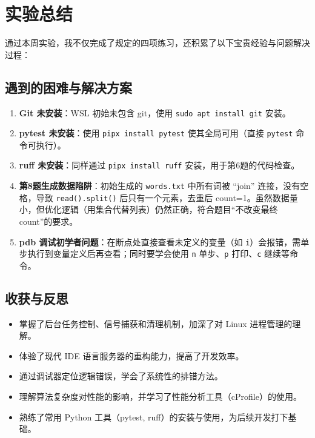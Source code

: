 \documentclass[12pt,a4paper]{ctexart}
\begin{document}
\newpage

\section*{实验总结}

通过本周实验，我不仅完成了规定的四项练习，还积累了以下宝贵经验与问题解决过程：

\subsection*{遇到的困难与解决方案}
\begin{enumerate}
    \item \textbf{Git 未安装}：WSL 初始未包含 git，使用 \texttt{sudo apt install git} 安装。
    \item \textbf{pytest 未安装}：使用 \texttt{pipx install pytest} 使其全局可用（直接 \texttt{pytest} 命令可执行）。
    \item \textbf{ruff 未安装}：同样通过 \texttt{pipx install ruff} 安装，用于第6题的代码检查。
    \item \textbf{第8题生成数据陷阱}：初始生成的 \texttt{words.txt} 中所有词被 ``join'' 连接，没有空格，导致 \texttt{read().split()} 后只有一个元素，去重后 count=1。虽然数据量小，但优化逻辑（用集合代替列表）仍然正确，符合题目“不改变最终 count”的要求。
    \item \textbf{pdb 调试初学者问题}：在断点处直接查看未定义的变量（如 \texttt{i}）会报错，需单步执行到变量定义后再查看；同时要学会使用 \texttt{n} 单步、\texttt{p} 打印、\texttt{c} 继续等命令。
\end{enumerate}

\subsection*{收获与反思}
\begin{itemize}
    \item 掌握了后台任务控制、信号捕获和清理机制，加深了对 Linux 进程管理的理解。
    \item 体验了现代 IDE 语言服务器的重构能力，提高了开发效率。
    \item 通过调试器定位逻辑错误，学会了系统性的排错方法。
    \item 理解算法复杂度对性能的影响，并学习了性能分析工具（cProfile）的使用。
    \item 熟练了常用 Python 工具（pytest, ruff）的安装与使用，为后续开发打下基础。
\end{itemize}
\end{document}
